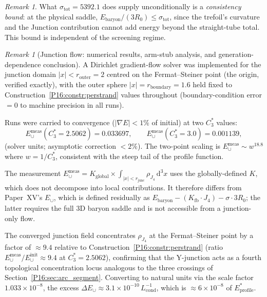 \documentclass[11pt,a4paper]{article}
\theoremstyle{definition}\newtheorem{definition}[theorem]{Definition}
\theoremstyle{remark}
\newtheorem{remark}[theorem]{Remark}
\theoremstyle{definition}\newtheorem{construction}[theorem]{Construction}
\begin{document}
\begin{remark}
\label{P16:rem:consistency_bound}
What $\sigma_{\mathrm{tot}}=5392.1$ does supply unconditionally is a
\emph{consistency bound}: at the physical saddle,
$E_{\mathrm{baryon}}/(3R_0)\leq\sigma_{\mathrm{tot}}$, since the
trefoil's curvature and the Junction contribution cannot add energy
beyond the straight-tube total.  This bound is independent of the
screening regime.
\end{remark}

\begin{remark}[Junction flow: numerical results, arm-stub analysis, and generation-dependence conclusion]
\label{P16:rem:junction_results}
A Dirichlet gradient-flow solver was implemented for the junction
domain $|x|<r_{\mathrm{outer}}=2$ centred on the Fermat--Steiner point
(the origin, verified exactly), with the outer sphere
$|x|=r_{\mathrm{boundary}}=1.6$ held fixed to Construction~\ref{P16:constr:perstrand} values
throughout (boundary-condition error $=0$ to machine precision in all runs).

Runs were carried to convergence ($|\nabla E|<1\%$ of initial) at two
$C_3^*$ values:
\begin{equation}
  E_{\cup}^{\mathrm{meas}}(C_3^*=2.5062) = 0.033697,\qquad
  E_{\cup}^{\mathrm{meas}}(C_3^*=3.0)    = 0.001139,
  \label{P16:eq:Ejunc_measured}
\end{equation}
(solver units; asymptotic correction $<2\%$).  The two-point scaling is
$E_\cup^{\mathrm{meas}}\sim w^{18.8}$ where $w=1/C_3^*$, consistent
with the steep tail of the profile function.

The measurement $E_\cup^{\mathrm{meas}} = K_{\mathrm{global}}\times
\int_{|x|<r_{\mathrm{junc}}}\rho_{J_4}\,\mathrm{d}^3x$ uses the
globally-defined $K$, which does not decompose into local contributions.
It therefore differs from Paper~XV's $E_\cup$, which is defined residually
as $E_{\mathrm{baryon}} - (K_{\mathrm{fb}}\cdot J_4) - \sigma\cdot3R_0$;
the latter requires the full 3D baryon saddle and is not accessible from
a junction-only flow.

The converged junction field concentrates $\rho_{J_4}$ at the
Fermat--Steiner point by a factor of $\approx9.4$ relative to
Construction~\ref{P16:constr:perstrand} (ratio $E_\cup^{\mathrm{meas}}/E_\cup^{\mathrm{init}}
\approx9.4$ at $C_3^*=2.5062$), confirming that the Y-junction acts as
a fourth topological concentration locus analogous to the three crossings
of Section~\ref{P16:sec:arc_segment}.  Converting to natural units via the
scale factor $1.033\times10^{-8}$, the excess
$\Delta E_\cup\approx3.1\times10^{-10}\,L_{\mathrm{cond}}^{-1}$,
which is $\approx6\times10^{-8}$ of $E_{\mathrm{profile}}^*$.


\end{remark}
\end{document}
